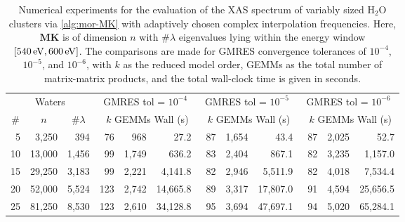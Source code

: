 \begin{table}[hbtp]
\caption{Numerical experiments for the evaluation of the XAS spectrum of variably sized
H$_2$O clusters via \cref{alg:mor-MK} with adaptively chosen complex interpolation
frequencies. Here, $\mathbf{M}\mathbf{K}$ is of dimension $n$
with $\#\lambda$ eigenvalues lying within the energy window
$[540\,\mathrm{eV},600\,\mathrm{eV}]$. The comparisons are made for GMRES convergence
tolerances of $10^{-4}$, $10^{-5}$, and $10^{-6}$, with $k$ as the reduced model order,
GEMMs as the total number of matrix-matrix products, and the total wall-clock time is given in
seconds.%
\label{tab:waters}}
\vspace{-0.5em}
\begin{center} \small
\begin{tabularx}{\textwidth}{rrr|rrr|rrr|rrr}
\toprule
\multicolumn{3}{c|}{Waters} &
 \multicolumn{3}{c|}{GMRES tol = $10^{-4}$} &
 \multicolumn{3}{c|}{GMRES tol = $10^{-5}$} &
 \multicolumn{3}{c}{GMRES tol = $10^{-6}$} \\[2pt]
\multicolumn{1}{c}{\#} &
 \multicolumn{1}{c}{$n$} &
 \multicolumn{1}{c|}{\#$\lambda$} &
 \multicolumn{3}{l|}{\ \,$k$ \hfill GEMMs \hfill Wall (s)} &
 \multicolumn{3}{l|}{\ \,$k$ \hfill GEMMs \hfill Wall (s)} &
 \multicolumn{3}{l}{\ \,$k$ \hfill GEMMs \hfill Wall (s)} \\
\midrule
 5 &  3,250 &   394 & \ 76 &   968 &     27.2 & \ 87 & 1,654 &     43.4 & \ 87 & 2,025 &     52.7 \\
10 & 13,000 & 1,456 &   99 & 1,749 &    636.2 &   83 & 2,404 &    867.1 &   82 & 3,235 &  1,157.0 \\
15 & 29,250 & 3,183 &   99 & 2,221 &  4,141.8 &   82 & 2,946 &  5,511.9 &   82 & 4,018 &  7,534.4 \\
20 & 52,000 & 5,524 &  123 & 2,742 & 14,665.8 &   89 & 3,317 & 17,807.0 &   91 & 4,594 & 25,656.5 \\
25 & 81,250 & 8,530 &  123 & 2,610 & 34,128.8 &   95 & 3,694 & 47,697.1 &   94 & 5,020 & 65,284.1 \\
\bottomrule
\end{tabularx}
\vspace{-1em}
\end{center}
\end{table}

